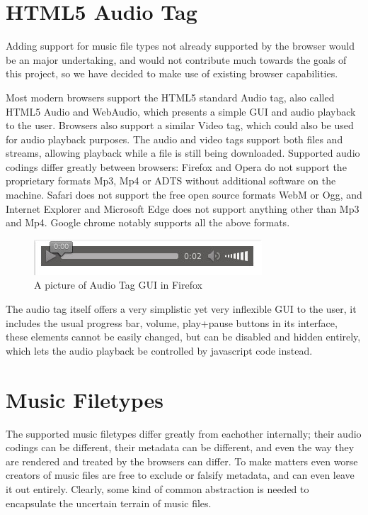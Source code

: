 \section{HTML5 Audio Tag}
Adding support for music file types not already supported by the browser 
would be an major undertaking, 
and would not contribute much towards the goals of this project, 
so we have decided to make use of existing browser capabilities.
\newline

Most modern browsers support the HTML5 standard Audio tag,
also called HTML5 Audio and WebAudio,
which presents a simple GUI and audio playback to the user.
Browsers also support a similar Video tag, 
which could also be used for audio playback purposes.
The audio and video tags support both files and streams, 
allowing playback while a file is still being downloaded.
\newline
Supported audio codings differ greatly between browsers:
Firefox and Opera do not support the proprietary formats Mp3, Mp4 or ADTS
without additional software on the machine.
Safari does not support the free open source formats WebM or Ogg,
and Internet Explorer and Microsoft Edge does not support anything other than Mp3 and Mp4.
Google chrome notably supports all the above formats.
\newline

\begin{figure}[h]
  \centering
    \includegraphics[scale=0.5]{gfx/audioTag.jpg}
  \caption{A picture of Audio Tag GUI in Firefox}
  \label{fig:audiotag}
\end{figure}

The audio tag itself offers a very simplistic yet very inflexible GUI to the user, 
it includes the usual progress bar, volume, play+pause buttons in its interface, 
these elements cannot be easily changed, but can be disabled and hidden entirely, 
which lets the audio playback be controlled by javascript code instead.
\newline

\section{Music Filetypes}
The supported music filetypes differ greatly from eachother internally; 
their audio codings can be different, their metadata can be different,
and even the way they are rendered and treated by the browsers can differ.
To make matters even worse creators of music files are free to exclude or falsify metadata, 
and can even leave it out entirely.
Clearly, some kind of common abstraction is needed to encapsulate the uncertain terrain of music files.
\newline

